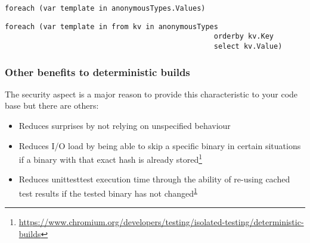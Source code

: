 \begin{lstlisting}[label={lst:undeterministic-values}]
foreach (var template in anonymousTypes.Values)
\end{lstlisting}

\begin{lstlisting}[label={lst:deterministic-values}]
foreach (var template in from kv in anonymousTypes 
												 orderby kv.Key 
												 select kv.Value)
\end{lstlisting}

\subsubsection{Other benefits to deterministic builds}
\label{sec:deterministic-builds-benefits}

The security aspect is a major reason to provide this characteristic to your code base but there are others:

\begin{itemize}
\item Reduces surprises by not relying on unspecified behaviour
\item Reduces I/O load by being able to skip a specific binary in certain situations if a binary with that exact hash is already stored\footnote{\label{ft:chromium}\url{https://www.chromium.org/developers/testing/isolated-testing/deterministic-builds}}
\item Reduces \gls{unittest}{test} execution time through the ability of re-using cached test results if the tested binary has not changed\textsuperscript{\ref{ft:chromium}}
\end{itemize}